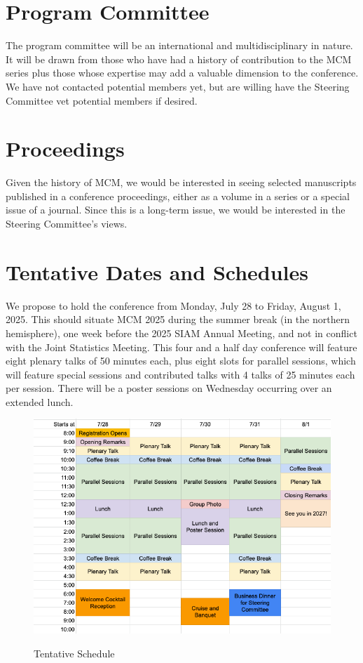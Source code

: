 \documentclass{article}
\newcommand{\yuhannote}[1]{{\color{purple}Yuhan: #1}}
\begin{document}
\section{Program Committee}
The program committee will be an international and multidisciplinary in nature.  It will be drawn from those who have had a history of contribution to the MCM series plus those whose expertise may add a valuable dimension to the conference.  We have not contacted potential members yet, but are willing have the Steering Committee vet potential members if desired.

\section{Proceedings}

Given the history of MCM, we would be interested in seeing selected manuscripts published in a conference proceedings, either as a volume in a series or a special issue of a journal.  Since this is a long-term issue, we would be interested in the Steering Committee's views.

\section{Tentative Dates and Schedules}

We propose to hold the conference from Monday, July 28 to Friday, August 1, 2025.  This should situate MCM 2025 during the summer break (in the northern hemisphere), one week before the 2025 SIAM Annual Meeting, and not in conflict with the Joint Statistics Meeting.  This four and a half day conference will feature eight plenary talks of 50 minutes each, plus eight slots for parallel sessions, which will feature special sessions and contributed talks with 4 talks of 25 minutes each per session.
There will be a poster sessions on Wednesday occurring over an extended lunch.

\begin{figure}[h]
    \centering
    \includegraphics[width =.95\textwidth]{MCMSchedule.png}
    \centerline{Tentative Schedule}
\end{figure}
\end{document}
